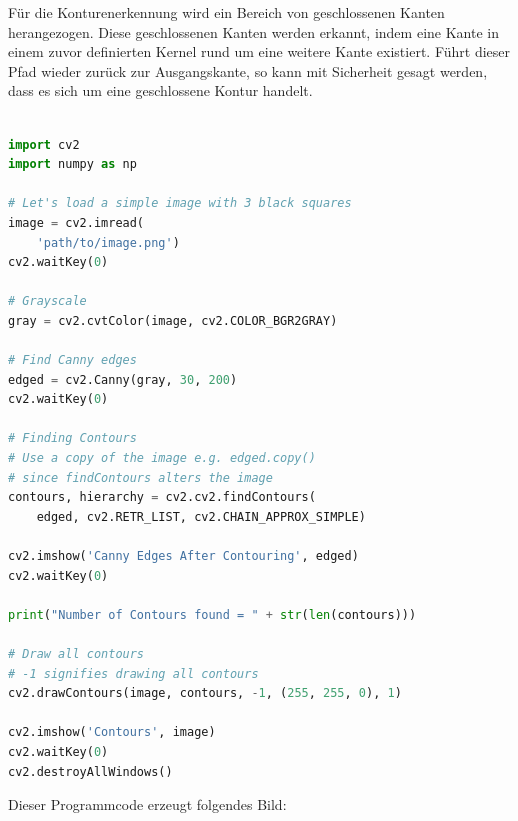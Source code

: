 Für die Konturenerkennung wird ein Bereich von geschlossenen Kanten herangezogen. Diese geschlossenen Kanten werden erkannt, indem eine Kante in einem zuvor definierten Kernel rund um eine weitere Kante existiert. Führt dieser Pfad wieder zurück zur Ausgangskante, so kann mit Sicherheit gesagt werden, dass es sich um eine geschlossene Kontur handelt.



\begin{lstlisting}[caption=Adaptive Gaussian Thresholding,language=Python,label=maai:gaussianthresholding]
    
import cv2
import numpy as np

# Let's load a simple image with 3 black squares
image = cv2.imread(
    'path/to/image.png')
cv2.waitKey(0)

# Grayscale
gray = cv2.cvtColor(image, cv2.COLOR_BGR2GRAY)

# Find Canny edges
edged = cv2.Canny(gray, 30, 200)
cv2.waitKey(0)

# Finding Contours
# Use a copy of the image e.g. edged.copy()
# since findContours alters the image
contours, hierarchy = cv2.cv2.findContours(
    edged, cv2.RETR_LIST, cv2.CHAIN_APPROX_SIMPLE)

cv2.imshow('Canny Edges After Contouring', edged)
cv2.waitKey(0)

print("Number of Contours found = " + str(len(contours)))

# Draw all contours
# -1 signifies drawing all contours
cv2.drawContours(image, contours, -1, (255, 255, 0), 1)

cv2.imshow('Contours', image)
cv2.waitKey(0)
cv2.destroyAllWindows()

\end{lstlisting}

Dieser Programmcode erzeugt folgendes Bild:


